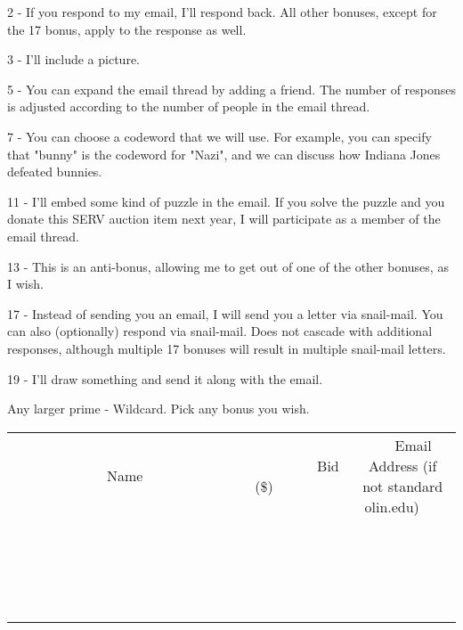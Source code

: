 \documentclass[11pt]{article}
\begin{document}
2 - If you respond to my email, I'll respond back. All other bonuses, except for the 17 bonus, apply to the response as well.

3 - I'll include a picture.

5 - You can expand the email thread by adding a friend. The number of responses is adjusted according to the number of people in the email thread.

7 - You can choose a codeword that we will use. For example, you can specify that "bunny" is the codeword for "Nazi", and we can discuss how Indiana Jones defeated bunnies.

11 - I'll embed some kind of puzzle in the email. If you solve the puzzle and you donate this SERV auction item next year, I will participate as a member of the email thread.

13 - This is an anti-bonus, allowing me to get out of one of the other bonuses, as I wish.

17 - Instead of sending you an email, I will send you a letter via snail-mail. You can also (optionally) respond via snail-mail. Does not cascade with additional responses, although multiple 17 bonuses will result in multiple snail-mail letters.

19 - I'll draw something and send it along with the email.

Any larger prime - Wildcard. Pick any bonus you wish.
\\[3ex]
\begin{tabular}{c c c}
~~~~~~~~~~~~~Name~~~~~~~~~~~~~ & ~~~~~~~~~Bid (\$)~~~~~~~~~  & ~~~Email Address (if not standard olin.edu)~~~\\
 & & \\
\hline
 & & \\
\hline
 & & \\
\hline
 & & \\
\hline
 & & \\
\hline
 & & \\
\hline
 & & \\
\hline
 & & \\
\hline
 & & \\
\hline
 & & \\
\hline
 & & \\
\hline
 & & \\
\hline
 & & \\
\hline
 & & \\
\hline
 & & \\
\hline
 & & \\
\hline
 & & \\
\hline
 & & \\
\hline
 & & \\
\hline
\end{tabular}
\newpage
\end{document}
